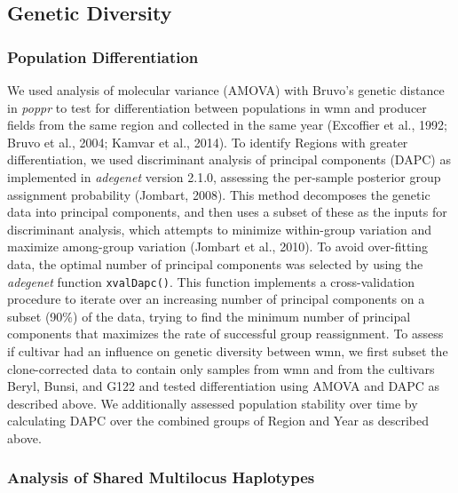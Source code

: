 \documentclass[fleqn,10pt,lineno]{wlpeerj} %
\theoremstyle{definition}
\theoremstyle{definition}
\theoremstyle{definition}
\theoremstyle{remark}
\begin{document}
\subsection*{Genetic Diversity}\label{genetic-diversity}

\subsubsection*{Population
Differentiation}\label{population-differentiation}

We used analysis of molecular variance (AMOVA) with Bruvo's genetic
distance in \emph{poppr} to test for differentiation between populations
in wmn and producer fields from the same region and collected in the
same year (Excoffier et al., 1992; Bruvo et al., 2004; Kamvar et al.,
2014). To identify Regions with greater differentiation, we used
discriminant analysis of principal components (DAPC) as implemented in
\emph{adegenet} version 2.1.0, assessing the per-sample posterior group
assignment probability (Jombart, 2008). This method decomposes the
genetic data into principal components, and then uses a subset of these
as the inputs for discriminant analysis, which attempts to minimize
within-group variation and maximize among-group variation (Jombart et
al., 2010). To avoid over-fitting data, the optimal number of principal
components was selected by using the \emph{adegenet} function
\texttt{xvalDapc()}. This function implements a cross-validation
procedure to iterate over an increasing number of principal components
on a subset (90\%) of the data, trying to find the minimum number of
principal components that maximizes the rate of successful group
reassignment. To assess if cultivar had an influence on genetic
diversity between wmn, we first subset the clone-corrected data to
contain only samples from wmn and from the cultivars Beryl, Bunsi, and
G122 and tested differentiation using AMOVA and DAPC as described above.
We additionally assessed population stability over time by calculating
DAPC over the combined groups of Region and Year as described above.

\subsubsection*{Analysis of Shared Multilocus
Haplotypes}\label{analysis-of-shared-multilocus-haplotypes}
\end{document}
